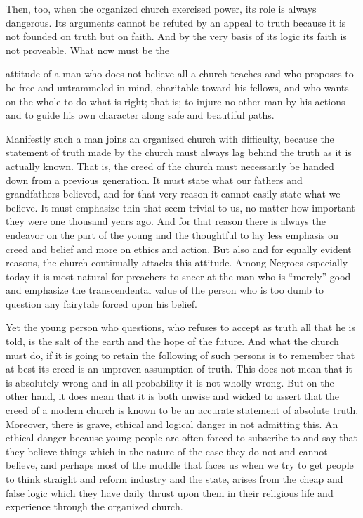\documentclass[letterpaper,10pt,english]{jupyterBook}
\begin{document}
\sphinxAtStartPar
Then, too, when the organized church exercised power, its role is always dangerous. Its arguments cannot be refuted by an appeal to truth because it is not founded on truth but on faith. And by the very basis of its logic its faith is not proveable. What now must be the

\sphinxAtStartPar
attitude of a man who does not believe all a church teaches and who proposes to be free and untrammeled in mind, charitable toward his fellows, and who wants on the whole to do what is right; that is; to injure no other man by his actions and to guide his own character along safe and beautiful paths.

\sphinxAtStartPar
Manifestly such a man joins an organized church with difficulty, because the statement of truth made by the church must always lag behind the truth as it is actually known. That is, the creed of the church must necessarily be handed down from a previous generation. It must state what our fathers and grandfathers believed, and for that very reason it cannot easily state what we believe. It must emphasize thin that seem trivial to us, no matter how important they were one thousand years ago. And for that reason there is always the endeavor on the part of the young and the thoughtful to lay less emphasis on creed and belief and more on ethics and action. But also and for equally evident reasons, the church continually attacks this attitude. Among Negroes especially today it is most natural for preachers to sneer at the man who is “merely” good and emphasize the transcendental value of the person who is too dumb to question any fairytale forced upon his belief.

\sphinxAtStartPar
Yet the young person who questions, who refuses to accept as truth all that he is told, is the salt of the earth and the hope of the future. And what the church must do, if it is going to retain the following of such persons is to remember that at best its creed is an unproven assumption of truth. This does not mean that it is absolutely wrong and in all probability it is not wholly wrong. But on the other hand, it does mean that it is both unwise and wicked to assert that the creed of a modern church is known to be an accurate statement of absolute truth. Moreover, there is grave, ethical and logical danger in not admitting this. An ethical danger because young people are often forced to subscribe to and say that they believe things which in the nature of the case they do not and cannot believe, and perhaps most of the muddle that faces us when we try to get people to think straight and reform industry and the state, arises from the cheap and false logic which they have daily thrust upon them in their religious life and experience through the organized church.
\end{document}
